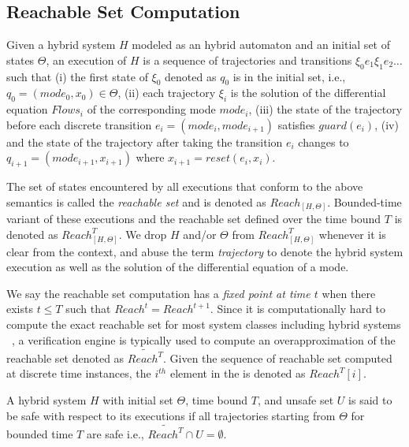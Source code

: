 \subsection{Reachable Set Computation}

\begin{definition}

Given a hybrid system $H$ modeled as an hybrid automaton and an initial set of states $\Theta$, an execution of $H$ is a sequence of trajectories and transitions $\xi_0 e_1 \xi_1 e_2 \ldots $ such that
%
(i) the first state of $\xi_0$ denoted as $q_0$ is in the initial set, i.e., $q_0 = (mode_0, x_0)\in \Theta$,
%
(ii) each trajectory $\xi_i$ is the solution of the differential equation $Flows_{i}$ of the corresponding mode $mode_i$, 
%
(iii) the state of the trajectory before each discrete transition $e_i = (mode_i, mode_{i+1})$ satisfies $guard(e_i)$,
%
(iv) and the state of the trajectory after taking the transition $e_i$ changes to $q_{i+1} = (mode_{i+1}, x_{i+1})$ where $x_{i+1} = reset (e_i, x_i)$.
\end{definition}
%
The set of states encountered by all executions that conform to the above semantics is called the \emph{reachable set} and is denoted as $Reach_{[H, \Theta]}$. Bounded-time variant of these executions and the reachable set defined over the time bound $T$ is denoted as $Reach_{[H, \Theta]}^T$. We drop $H$ and/or $\Theta$ from $Reach_{[H, \Theta]}^T$ whenever it is clear from the context, and abuse the term \emph{trajectory} to denote the hybrid system execution as well as the solution of the differential equation of a mode.

We say the reachable set computation has a \emph{fixed point at time $t$} when there exists $t \leq T$ such that $Reach^t = Reach^{t+1}$.
Since it is computationally hard to compute the exact reachable set for most system classes including hybrid systems ~\cite{ALUR19953,10.1007/3-540-46430-1_6}, a verification engine is typically used to compute an overapproximation of the reachable set denoted as $\tilde{Reach^T}$. Given the sequence of reachable set computed at discrete time instances, the $i^{th}$ element in the is denoted as $Reach^T[i]$.

\vspace{0.2cm}
\begin{definition}
\label{def:hybridSafe}
A hybrid system $H$ with initial set $\Theta$, time bound $T$, and unsafe set $U$ is said to be safe with respect to its executions if all trajectories starting from $\Theta$ for bounded time $T$ are safe i.e., $\tilde{Reach^T} \cap U = \emptyset$.
\end{definition}

